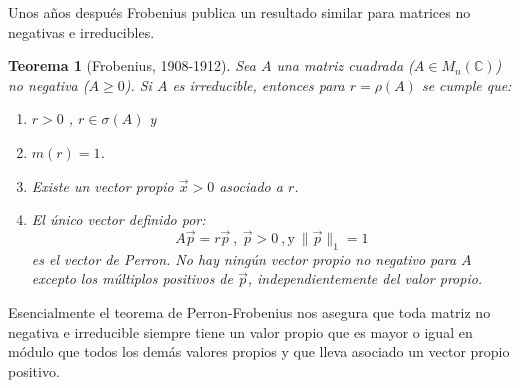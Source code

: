 \documentclass[size=a4, parskip=half, titlepage=false, toc=flat, toc=bib, 12pt, twoside]{scrartcl}
\theoremstyle{theorem-style}
\newtheorem{nth}{Teorema}[section]
\theoremstyle{definition-style}
\theoremstyle{remark-style}
\theoremstyle{example-style}
\theoremstyle{definition-style}
\theoremstyle{remark-style}
\begin{document}
Unos años después Frobenius publica un resultado similar para matrices no negativas e irreducibles.

\begin{nth}[Frobenius, 1908-1912]
Sea $A $ una matriz cuadrada ($A \in M_n(\mathbb{C})$) no negativa ($A \geq 0$). Si $A$ es irreducible, entonces para $r = \rho(A)$ se cumple que:
\begin{enumerate}
\item $r >0$ , $r \in \sigma(A)$ y
\item $m(r) = 1$.
\item Existe un vector propio $\vec{x} > 0$ asociado a $r$.
\item El único vector definido por:
$$A \vec{p} = r \vec{p}  \ , \ \vec{p}> 0 \ , \textrm{y} \ \|\vec{p}\|_1 = 1 $$
es el vector de Perron. No hay ningún vector propio no negativo para $A$ excepto los múltiplos positivos de $\vec{p}$, independientemente del valor propio.
\end{enumerate}
\end{nth}

Esencialmente el teorema de Perron-Frobenius nos asegura que toda matriz no negativa e irreducible siempre tiene un valor propio que es mayor o igual en módulo que todos los demás valores propios y que lleva asociado un vector propio positivo.
\end{document}
